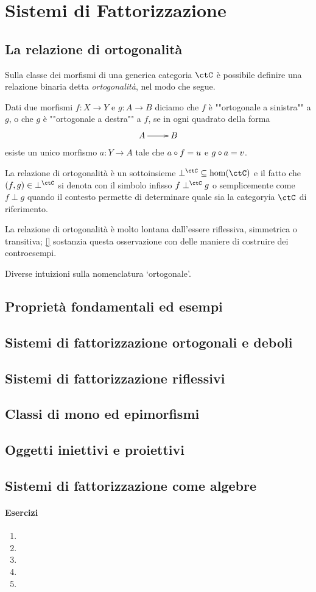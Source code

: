 \chapter{Sistemi di Fattorizzazione}
\section[Ortogonalità]{La relazione di ortogonalità}
Sulla classe dei morfismi di una generica categoria $\ctC$ è possibile definire una relazione binaria detta \emph{ortogonalità}, nel modo che segue.
\begin{definition}
    Dati due morfismi $f : X\to Y$ e $g : A\to B$ diciamo che $f$ è ""ortogonale a sinistra"" a $g$, o che $g$ è ""ortogonale a destra"" a $f$, se in ogni quadrato della forma
    \[
        \vcenter{\xymatrix{A \ar[r] & B}}
    \]
esiste un unico morfismo $a : Y\to A$ tale che $a\circ f=u$ e $g\circ a=v$.
\end{definition}
La relazione di ortogonalità è un sottoinsieme $\mathbin{\perp^\ctC} \subseteq \hom(\ctC)$ e il fatto che $(f,g)\in \mathbin{\perp^\ctC}$ si denota con il simbolo infisso $f\perp^\ctC g$ o semplicemente come $f\perp g$ quando il contesto permette di determinare quale sia la categoryia \(\ctC\) di riferimento.

La relazione di ortogonalità è molto lontana dall'essere riflessiva, simmetrica o transitiva; \autoref{} sostanzia questa osservazione con delle maniere di costruire dei controesempi.
\begin{remark}
Diverse intuizioni sulla nomenclatura `ortogonale'.
\end{remark}

\section[Proprietà ed esempi]{Proprietà fondamentali ed esempi}
\section[Fattorizzazione]{Sistemi di fattorizzazione ortogonali e deboli}
\section[Riflessività]{Sistemi di fattorizzazione riflessivi}
\section[Mono ed epimorfismi]{Classi di mono ed epimorfismi}
\section[Iniettivi e proiettivi]{Oggetti iniettivi e proiettivi}
\section[Fattorizzazione e algebre]{Sistemi di fattorizzazione come algebre}
\subsubsection*{Esercizi}
\begin{enumerate}
    \item
    \item
    \item
    \item
    \item
\end{enumerate}
